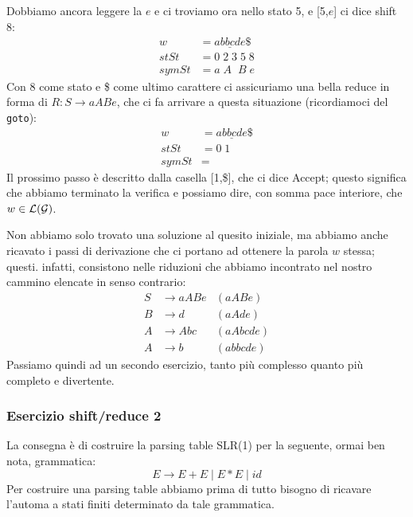 \documentclass[class=book, crop=false, oneside, 12pt]{standalone}
\begin{document}
Dobbiamo ancora leggere la \(e\) e ci troviamo ora nello stato 5, e [5,\(e\)] ci dice shift 8:
\begin{align*}
    w &= \underline{abbcde}\$ \\
    stSt &= 0\;2\;3\;5\;8\\
    symSt &= a\;A\;\;B\;e
\end{align*}
Con 8 come stato e \$ come ultimo carattere ci assicuriamo una bella reduce in forma di \(R: S \to aABe\), che ci fa arrivare a questa situazione (ricordiamoci del \texttt{goto}):
\begin{align*}
    w &= \underline{abbcde}\$ \\
    stSt &= 0\;1\\
    symSt &= 
\end{align*}
Il prossimo passo è descritto dalla casella [1,\$], che ci dice Accept; questo significa che abbiamo terminato la verifica e possiamo dire, con somma pace interiore, che \(w \in \mathcal{L}(\mathcal{G})\).

Non abbiamo solo trovato una soluzione al quesito iniziale, ma abbiamo anche ricavato i passi di derivazione che ci portano ad ottenere la parola \(w\) stessa; questi. infatti, consistono nelle riduzioni che abbiamo incontrato nel nostro cammino elencate in senso contrario:
\begin{align*}
    S &\to aABe &(aABe)\\
    B &\to d &(aAde)\\
    A &\to Abc &(aAbcde)\\
    A &\to b &(abbcde)
\end{align*}
Passiamo quindi ad un secondo esercizio, tanto più complesso quanto più completo e divertente.

\subsubsection{Esercizio shift/reduce 2}
La consegna è di costruire la parsing table SLR(1) per la seguente, ormai ben nota, grammatica:
\begin{equation}
    \label{eq:ex2-sh/re-grammar}
    E \to E+E \mid E*E \mid id
\end{equation} 
Per costruire una parsing table abbiamo prima di tutto bisogno di ricavare l'automa a stati finiti determinato da tale grammatica.
\end{document}
